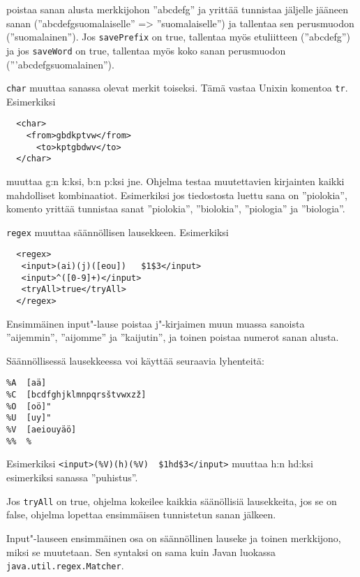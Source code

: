 \documentclass[12pt,a4paper]{scrartcl}
\begin{document}
poistaa sanan alusta merkkijohon ''abcdefg'' ja yrittää tunnistaa
jäljelle jääneen sanan (''abcdefgsuomalaiselle'' => ''suomalaiselle'')
ja tallentaa sen perusmuodon (''suomalainen''). Jos \verb|savePrefix|
on true, tallentaa myös etuliitteen (''abcdefg'') ja jos
\verb|saveWord| on true, tallentaa myös koko sanan perusmuodon
('''abcdefgsuomalainen'').




\bigskip
\verb|char| muuttaa sanassa olevat merkit toiseksi. Tämä vastaa Unixin
komentoa \verb|tr|. Esimerkiksi

\begin{verbatim}
  <char>
    <from>gbdkptvw</from>
      <to>kptgbdwv</to>
  </char>
\end{verbatim}

muuttaa g:n k:ksi, b:n p:ksi jne. Ohjelma testaa muutettavien
kirjainten kaikki mahdolliset kombinaatiot. Esimerkiksi jos
tiedostosta luettu sana on ''piolokia'', komento yrittää tunnistaa
sanat ''piolokia'', ''biolokia'', ''piologia'' ja ''biologia''.




\bigskip
\verb|regex| muuttaa säännöllisen lausekkeen. Esimerkiksi

\begin{verbatim}
  <regex>
   <input>(ai)(j)([eou])   $1$3</input>
   <input>^([0-9]+)</input>
   <tryAll>true</tryAll>
  </regex>
\end{verbatim}

Ensimmäinen input"-lause poistaa j"-kirjaimen muun muassa sanoista
''aijemmin'', ''aijomme'' ja ''kaijutin'', ja toinen poistaa numerot
sanan alusta.

Säännöllisessä lausekkeessa voi käyttää seuraavia lyhenteitä:

\begin{verbatim}
%A  [aä]
%C  [bcdfghjklmnpqrsštvwxzž]
%O  [oö]"
%U  [uy]"
%V  [aeiouyäö]
%%  %
\end{verbatim}

Esimerkiksi \verb=<input>(%V)(h)(%V)  $1hd$3</input>=
muuttaa h:n hd:ksi esimerkiksi sanassa ''puhistus''.

Jos \verb=tryAll= on true, ohjelma kokeilee kaikkia säänöllisiä
lausekkeita, jos se on false, ohjelma lopettaa ensimmäisen tunnistetun
sanan jälkeen.

Input"-lauseen ensimmäinen osa on säännöllinen lauseke ja toinen
merkkijono, miksi se muutetaan. Sen syntaksi on sama kuin Javan
luokassa \verb=java.util.regex.Matcher=.
\end{document}
